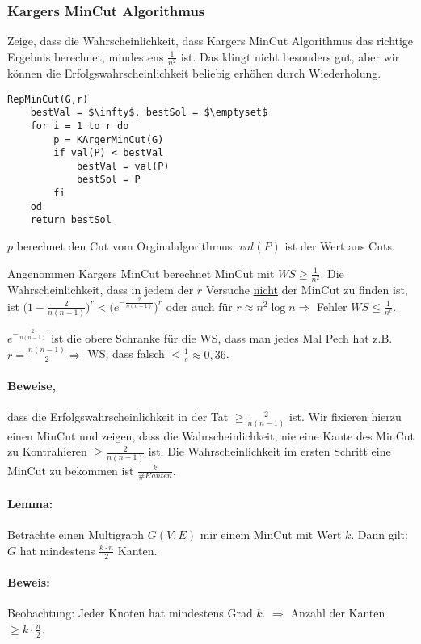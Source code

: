 \subsubsection{Kargers MinCut Algorithmus}
Zeige, dass die Wahrscheinlichkeit, dass Kargers MinCut Algorithmus das richtige Ergebnis berechnet, mindestens $\frac{1}{n^2}$ ist. Das klingt nicht besonders gut, aber wir können die Erfolgswahrscheinlichkeit beliebig erhöhen durch Wiederholung.

\begin{lstlisting}[mathescape]
RepMinCut(G,r)
	bestVal = $\infty$, bestSol = $\emptyset$
	for i = 1 to r do
		p = KArgerMinCut(G)
		if val(P) < bestVal
			bestVal = val(P)
			bestSol = P
		fi
	od
	return bestSol
\end{lstlisting}
\minisec{} $p$ berechnet den Cut vom Orginalalgorithmus. $val(P)$ ist der Wert aus Cuts.

\minisec{} Angenommen Kargers MinCut berechnet MinCut mit $WS \geq \frac{1}{n^2}$. Die Wahrscheinlichkeit, dass in jedem der $r$ Versuche \underline{nicht} der MinCut zu finden ist, ist $\big(1-\frac{2}{n(n-1)}\big)^r < \big(e^{-\frac{2}{n(n-1)}}\big)^r$ oder auch für $r \approx n^2 \log n \Rightarrow $ Fehler $WS \leq \frac{1}{n^c}$.

\minisec{} $e^{-\frac{2}{n(n-1)}}$ ist die obere Schranke für die WS, dass man jedes Mal Pech hat z.B. $r=\frac{n(n-1)}{2} \Rightarrow$ WS, dass falsch $\leq \frac{1}{e} \approx 0,36$.

\paragraph*{Beweise,} dass die Erfolgswahrscheinlichkeit in der Tat $\geq \frac{2}{n(n-1)}$ ist. Wir fixieren hierzu einen MinCut und zeigen, dass die Wahrscheinlichkeit, nie eine Kante des MinCut zu Kontrahieren $\geq \frac{2}{n(n-1)}$ ist.
Die Wahrscheinlichkeit im ersten Schritt eine MinCut zu bekommen ist $\frac{k}{\#Kanten}$.

\paragraph*{Lemma:} Betrachte einen Multigraph $G(V,E)$ mir einem MinCut mit Wert $k$. Dann gilt: $G$ hat mindestens $\frac{k \cdot n}{2}$ Kanten.
\paragraph*{Beweis:} Beobachtung: Jeder Knoten hat mindestens Grad $k$. $\Rightarrow$ Anzahl der Kanten $\geq k \cdot \frac{n}{2}$.

